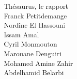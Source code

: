 \documentclass[a4paper, 12pt]{report}
\begin{document}
\begin{titlepage}
	\vspace*{\fill}
	\begin{center}
		{\Huge Thésaurus, le rapport}\\
		\vspace{\fill}
		Franck Petitdemange \\
		Nordine El Hassouni \\
		Issam Amal \\
		Cyril Monmouton \\
		Marouane Denguiri \\
		Mohamed Amine Zahir \\
		Abdelhamid Belarbi
	\end{center}
	\vspace*{\fill}
	\center{\today}
\end{titlepage}

\tableofcontents
\end{document}

